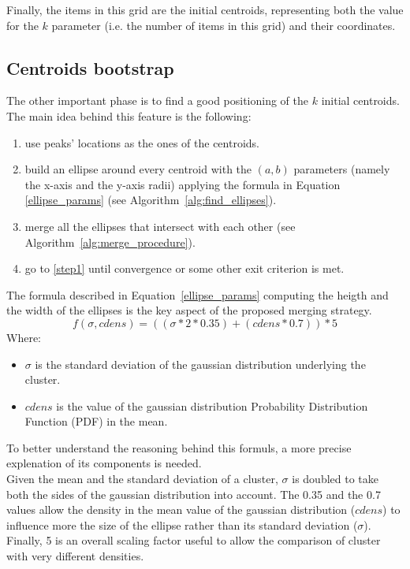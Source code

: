 Finally, the items in this grid are the initial centroids, representing both the value for the
$k$ parameter (i.e. the number of items in this grid) and their coordinates.


\subsection{Centroids bootstrap}
The other important phase is to find a good positioning of the $k$ initial centroids.
The main idea behind this feature is the following:
\begin{enumerate}
    \item \label{step1} use peaks' locations as the ones of the centroids.
    \item build an ellipse around every centroid with the $(a,b)$ parameters (namely the x-axis
        and the y-axis radii) applying the formula in Equation \ref{ellipse_params} (see
        Algorithm~\ref{alg:find_ellipses}).
    \item merge all the ellipses that intersect with each other (see
        Algorithm~\ref{alg:merge_procedure}).
    \item go to \ref{step1} until convergence or some other exit criterion is met.
\end{enumerate}




The formula described in Equation~\ref{ellipse_params} computing the heigth and the width of
the ellipses is the key aspect of the proposed merging strategy.
\begin{equation}
\label{ellipse_params}
    f(\sigma, cdens) = ((\sigma * 2 * 0.35) + (cdens * 0.7)) * 5
\end{equation}
Where:
\begin{itemize}
    \item $\sigma$ is the standard deviation of the gaussian distribution underlying the cluster.
    \item $cdens$ is the value of the gaussian distribution Probability Distribution Function (PDF)
        in the mean.
\end{itemize}

To better understand the reasoning behind this formuls, a more precise explenation of its components
is needed.\\
Given the mean and the standard deviation of a cluster,
$\sigma$ is doubled to take both the sides of the gaussian distribution into account.
The 0.35 and the 0.7 values allow the density in the mean value of the gaussian distribution ($cdens$)
to influence more the size of the ellipse rather than its standard deviation ($\sigma$). Finally, 5 is
an overall scaling factor useful to allow the comparison of cluster with very different densities.


